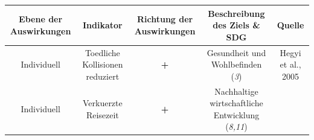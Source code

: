 \documentclass[
]{book}
\begin{document}
\begin{longtable}[]{@{}ccccc@{}}
\toprule
\begin{minipage}[b]{0.17\columnwidth}\centering
Ebene der Auswirkungen\strut
\end{minipage} & \begin{minipage}[b]{0.16\columnwidth}\centering
Indikator\strut
\end{minipage} & \begin{minipage}[b]{0.17\columnwidth}\centering
Richtung der Auswirkungen\strut
\end{minipage} & \begin{minipage}[b]{0.17\columnwidth}\centering
Beschreibung des Ziels \& SDG\strut
\end{minipage} & \begin{minipage}[b]{0.17\columnwidth}\centering
Quelle\strut
\end{minipage}\tabularnewline
\midrule
\endhead
\begin{minipage}[t]{0.17\columnwidth}\centering
Individuell\strut
\end{minipage} & \begin{minipage}[t]{0.16\columnwidth}\centering
Toedliche Kollisionen reduziert\strut
\end{minipage} & \begin{minipage}[t]{0.17\columnwidth}\centering
\textbf{+}\strut
\end{minipage} & \begin{minipage}[t]{0.17\columnwidth}\centering
Gesundheit und Wohlbefinden (\emph{3})\strut
\end{minipage} & \begin{minipage}[t]{0.17\columnwidth}\centering
Hegyi et al., 2005\strut
\end{minipage}\tabularnewline
\begin{minipage}[t]{0.17\columnwidth}\centering
Individuell\strut
\end{minipage} & \begin{minipage}[t]{0.16\columnwidth}\centering
Verkuerzte Reisezeit\strut
\end{minipage} & \begin{minipage}[t]{0.17\columnwidth}\centering
\textbf{+}\strut
\end{minipage} & \begin{minipage}[t]{0.17\columnwidth}\centering
Nachhaltige wirtschaftliche Entwicklung (\emph{8,11})\strut
\end{minipage} & \begin{minipage}[t]{0.17\columnwidth}\centering

\end{minipage}
\end{longtable}
\end{document}
